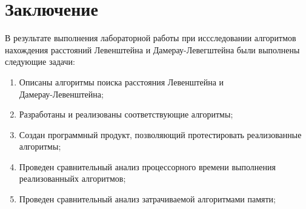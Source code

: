 \chapter*{Заключение}

В результате выполнения лабораторной работы при иссследовании алгоритмов нахождения расстояний Левенштейна и Дамерау-Левегштейна были выполнены следующие задачи:
\begin{enumerate}
    \item Описаны алгоритмы поиска расстояния Левенштейна и \\
    Дамерау-Левенштейна;
    \item Разработаны и реализованы соответствующие алгоритмы;
    \item Создан программный продукт, позволяющий протестировать реализованные алгоритмы;
    \item Проведен сравнительный анализ процессорного времени выполнения реализованныйх алгоритмов;
    \item Проведен сравнительный анализ затрачиваемой алгоритмами памяти;
\end{enumerate}